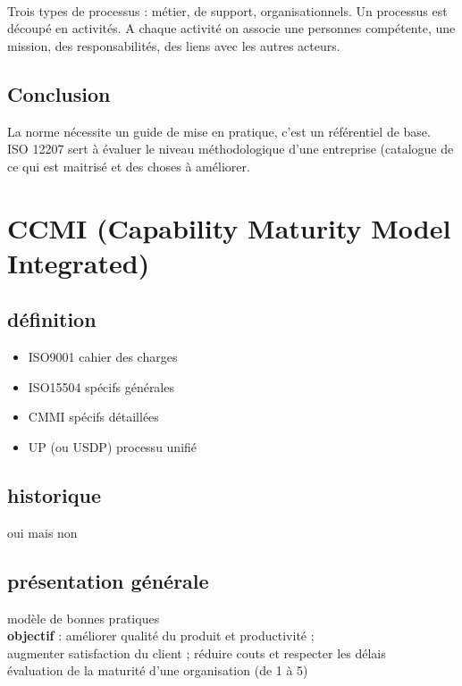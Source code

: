 \hfill\\

Trois types de processus : métier, de support, organisationnels.
Un processus est découpé en activités. A chaque activité on associe une personnes compétente, une mission, des responsabilités, des liens avec les autres acteurs.

	\subsection{Conclusion}

La norme nécessite un guide de mise en pratique, c’est un référentiel de base.\\
ISO 12207 sert à évaluer le niveau méthodologique d’une entreprise (catalogue de ce qui est maitrisé et des choses à améliorer.

\section{CCMI (Capability Maturity Model Integrated)}

	\subsection{définition}

\begin{itemize}
\item ISO9001 \rightarrow cahier des charges
\item ISO15504 \rightarrow spécifs générales
\item CMMI \rightarrow spécifs détaillées
\item UP (ou USDP) processu unifié
\end{itemize}

	\subsection{historique}

oui mais non

	\subsection{présentation générale}

modèle de bonnes pratiques\\
\textbf{objectif} : améliorer qualité du produit et productivité ;\\ augmenter satisfaction du client ; réduire couts et respecter les délais\\
évaluation de la maturité d’une organisation (de 1 à 5)

